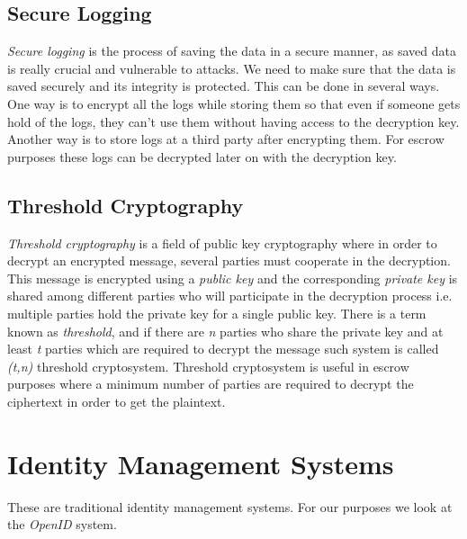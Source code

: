 \subsection{Secure Logging}
\textit{Secure logging}\cite{accorsi2006relationship} is the process of saving the data in a secure manner, as saved data is really crucial and vulnerable to attacks. We need to make sure that the data is saved securely and its integrity is protected. This can be done in several ways. One way is to encrypt all the logs while storing them so that even if someone gets hold of the logs, they can't use them without having access to the decryption key. Another way is to store logs at a third party after encrypting them. For escrow purposes these logs can be decrypted later on with the decryption key.
\subsection{Threshold Cryptography}
\textit{Threshold cryptography}\cite{DBLP:conf/acisp/DamgardJ03} is a field of public key cryptography where in order to decrypt an encrypted message, several parties must cooperate in the decryption. This message is encrypted using a \textit{public key} and the corresponding \textit{private key} is shared among different parties who will participate in the decryption process i.e. multiple parties hold the private key for a single public key. There is a term known as \textit{threshold}, and if there are \textit{n} parties who share the private key and at least \textit{t} parties which are required to decrypt the message such system is called \textit{(t,n)} threshold cryptosystem. Threshold cryptosystem is useful in escrow purposes where a minimum number of parties are required to decrypt the ciphertext in order to get the plaintext.

\section{Identity Management Systems}
These are traditional identity management systems. For our purposes we look at the \textit{OpenID}\cite{recordon2006openid} system.
